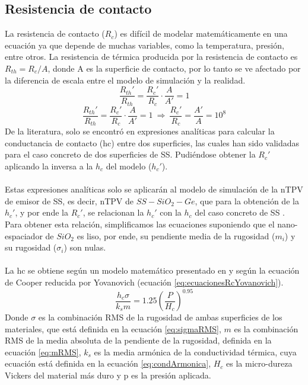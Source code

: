 \subsection{Resistencia de contacto}\label{sec:metodos_Rc}
La resistencia de contacto ($R_c$) es difícil de modelar matemáticamente en una ecuación ya que depende de muchas variables, como la temperatura, presión, entre otros. La resistencia de térmica producida por la resistencia de contacto es $R_{th}=R_{c}/A$, donde A es la superficie de contacto, por lo tanto se ve afectado por la diferencia de escala entre el modelo de simulación y la realidad.
\[ \dfrac{R_{th}'}{R_{th}}=\dfrac{R_c'}{R_c}\cdot \dfrac{A}{A'}=1 \]
\begin{equation}
	\dfrac{R_{th}'}{R_{th}}=\dfrac{R_c'}{R_c}\cdot \dfrac{A}{A'}=1 \ \Longrightarrow \  \dfrac{R_c'}{R_c}=\dfrac{A'}{A}=10^8
	\label{eq:relacion_Rc}
\end{equation}
De la literatura, solo se encontró en \cite{experimental_Rc_SS} expresiones analíticas para calcular la conductancia de contacto (\gls{hc}) entre dos superficies, las cuales han sido validadas para el caso concreto de dos superficies de SS. Pudiéndose obtener la $R_c'$ aplicando la inversa a la $h_c$ del modelo ($h_c'$).\\\\
Estas expresiones analíticas solo se aplicarán al modelo de simulación de la nTPV de emisor de SS, es decir, nTPV de $SS-SiO_2-Ge$, que para la obtención de la $h_c'$, y por ende la $R_c'$, se relacionan la $h_c'$ con la $h_c$ del caso concreto de SS \cite{experimental_Rc_SS}. Para obtener esta relación, simplificamos las ecuaciones suponiendo que el nano-espaciador de $SiO_2$ es liso, por ende, su pendiente media de la rugosidad ($m_i$) y su rugosidad ($\sigma_i$) son nulas.\\\\
La \gls{hc} se obtiene según un modelo matemático presentado en \cite{experimental_Rc_SS} y según la ecuación de Cooper reducida por Yovanovich (ecuación \eqref{eq:ecuacionesRcYovanovich}).\\
\begin{equation}
\dfrac{h_c\sigma}{k_sm}=1.25\left(\dfrac{P}{H_c}\right)^{0.95}
\label{eq:ecuacionesRcYovanovich}
\end{equation}
Donde $\sigma$ es la combinación RMS de la rugosidad de ambas superficies de los materiales, que está definida en la ecuación \eqref{eq:sigmaRMS}, $m$ es la combinación RMS de la media absoluta de la pendiente de la rugosidad, definida en la ecuación \eqref{eq:mRMS}, $k_s$ es la media armónica de la conductividad térmica, cuya ecuación está definida en la ecuación \eqref{eq:condArmonica}, $H_c$ es la micro-dureza Vickers del material más duro y \gls{p} es la presión aplicada.\\

